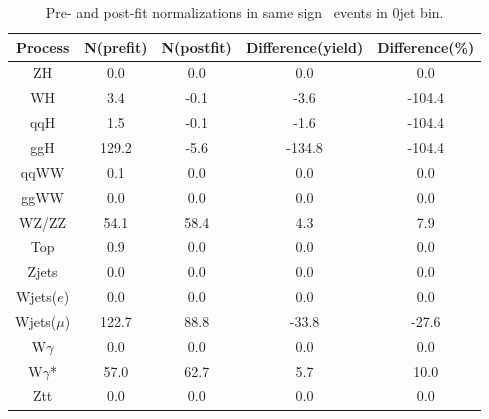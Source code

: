 \begin{table}[ht!]
\begin{center}
\begin{tabular}{c|cc|cc}
\hline
\hline
Process &    N(prefit) &   N(postfit) & Difference(yield) &  Difference(\%)  \\  
\hline
\hline
ZH          &        0.0 &        0.0 &        0.0 &        0.0        \\
WH          &        3.4 &       -0.1 &       -3.6 &     -104.4        \\
qqH         &        1.5 &       -0.1 &       -1.6 &     -104.4        \\
ggH         &      129.2 &       -5.6 &     -134.8 &     -104.4        \\
\hline
qqWW        &        0.1 &        0.0 &        0.0 &        0.0        \\
ggWW        &        0.0 &        0.0 &        0.0 &        0.0        \\
\hline
WZ/ZZ       &       54.1 &       58.4 &        4.3 &        7.9        \\
\hline
Top         &        0.9 &        0.0 &        0.0 &        0.0        \\
\hline
Zjets       &        0.0 &        0.0 &        0.0 &        0.0        \\
\hline
Wjets($e$)  &        0.0 &        0.0 &        0.0 &        0.0        \\
Wjets($\mu$)&      122.7 &       88.8 &      -33.8 &      -27.6        \\
\hline
W$\gamma$   &        0.0 &        0.0 &        0.0 &        0.0        \\
W$\gamma$*  &       57.0 &       62.7 &        5.7 &       10.0        \\
\hline
Ztt         &        0.0 &        0.0 &        0.0 &        0.0        \\
\hline
\hline
\end{tabular}
\caption{Pre- and post-fit normalizations in same sign \M\M~events in 0jet bin. }
\label{tab:fitval_norm_ssmm_0j}
\end{center}
\end{table}

